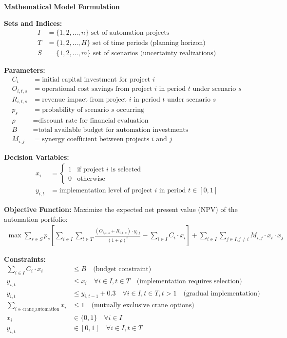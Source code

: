 \documentclass{article}
\begin{document}
\textbf{Mathematical Model Formulation}

\textbf{Sets and Indices:}
\begin{align}
I &= \{1, 2, \ldots, n\} \text{ set of automation projects} \\
T &= \{1, 2, \ldots, H\} \text{ set of time periods (planning horizon)} \\
S &= \{1, 2, \ldots, m\} \text{ set of scenarios (uncertainty realizations)}
\end{align}

\textbf{Parameters:}
\begin{align}
C_i &= \text{initial capital investment for project } i \\
O_{i,t,s} &= \text{operational cost savings from project } i \text{ in period } t \text{ under scenario } s \\
R_{i,t,s} &= \text{revenue impact from project } i \text{ in period } t \text{ under scenario } s \\
p_s &= \text{probability of scenario } s \text{ occurring} \\
\rho &= \text{discount rate for financial evaluation} \\
B &= \text{total available budget for automation investments} \\
M_{i,j} &= \text{synergy coefficient between projects } i \text{ and } j
\end{align}

\textbf{Decision Variables:}
\begin{align}
x_i &= \begin{cases} 
1 & \text{if project } i \text{ is selected} \\
0 & \text{otherwise}
\end{cases} \\
y_{i,t} &= \text{implementation level of project } i \text{ in period } t \in [0,1]
\end{align}

\textbf{Objective Function:}
Maximize the expected net present value (NPV) of the automation portfolio:
\begin{align}
\max \sum_{s \in S} p_s \left[ \sum_{i \in I} \sum_{t \in T} \frac{(O_{i,t,s} + R_{i,t,s}) \cdot y_{i,t}}{(1+\rho)^t} - \sum_{i \in I} C_i \cdot x_i \right] + \sum_{i \in I} \sum_{j \in I, j \neq i} M_{i,j} \cdot x_i \cdot x_j
\end{align}

\textbf{Constraints:}
\begin{align}
\sum_{i \in I} C_i \cdot x_i &\leq B \quad \text{(budget constraint)} \\
y_{i,t} &\leq x_i \quad \forall i \in I, t \in T \quad \text{(implementation requires selection)} \\
y_{i,t} &\leq y_{i,t-1} + 0.3 \quad \forall i \in I, t \in T, t > 1 \quad \text{(gradual implementation)} \\
\sum_{i \in \text{crane\_automation}} x_i &\leq 1 \quad \text{(mutually exclusive crane options)} \\
x_i &\in \{0, 1\} \quad \forall i \in I \\
y_{i,t} &\in [0, 1] \quad \forall i \in I, t \in T
\end{align}
\end{document}
